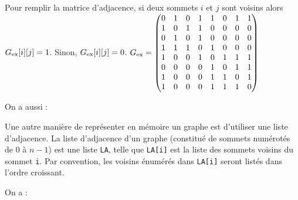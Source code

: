 \ifprof
\begin{corrige}
Pour remplir la matrice d'adjacence, si deux sommets $i$ et $j$ sont voisins alors ${G}_{\text{ex}}[i][j] = 1$.
 Sinon,  ${G}_{\text{ex}}[i][j] = 0$. 
${G}_{\text{ex}}=
\begin{pmatrix}
0 	& 1	& 0	& 1	& 1	& 0	& 1	& 1	\\ 
1 	& 0	& 1	& 1	& 0	& 0	& 0	& 0	\\ 
0 	& 1	& 0	& 1	& 0	& 0	& 0	& 0	\\ 
1	& 1	& 1	& 0	& 1	& 0	& 0	& 0	\\ 
1 	& 0	& 0	& 1	& 0	& 1	& 1	& 1	\\ 
0 	& 0	& 0	& 0	& 1	& 0	& 1	& 1	\\ 
1 	& 0	& 0	& 0	& 1	& 1	& 0	& 1	\\ 
1 	& 0	& 0	& 0	& 1	& 1	& 1	& 0	\\ 
\end{pmatrix}$

On a aussi : 

\end{corrige}
\else
\fi

Une autre manière de représenter en mémoire un graphe est d'utiliser une liste d'adjacence. La liste d'adjacence d'un graphe (constitué de sommets numérotés de 0 à $n-1$) est une liste \lstinline{LA}, telle que \lstinline{LA[i]} est la liste des sommets voisins du sommet \lstinline{i}. Par convention, les voisins énumérés dans \lstinline{LA[i]} seront listés dans l'ordre croissant.

\ifprof
\begin{corrige}
On a  :




\end{corrige}
\else
\fi

